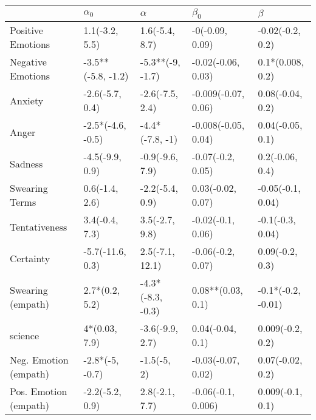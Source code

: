 \begin{tabular}{lllll}
\toprule
{} &          $\alpha_0$ &           $\alpha$ &            $\beta_0$ &             $\beta$ \\
\midrule
Positive Emotions     &      1.1(-3.2, 5.5) &     1.6(-5.4, 8.7) &      -0(-0.09, 0.09) &    -0.02(-0.2, 0.2) \\
Negative Emotions     &  -3.5**(-5.8, -1.2) &   -5.3**(-9, -1.7) &   -0.02(-0.06, 0.03) &    0.1*(0.008, 0.2) \\
Anxiety               &     -2.6(-5.7, 0.4) &    -2.6(-7.5, 2.4) &  -0.009(-0.07, 0.06) &    0.08(-0.04, 0.2) \\
Anger                 &   -2.5*(-4.6, -0.5) &    -4.4*(-7.8, -1) &  -0.008(-0.05, 0.04) &    0.04(-0.05, 0.1) \\
Sadness               &     -4.5(-9.9, 0.9) &    -0.9(-9.6, 7.9) &    -0.07(-0.2, 0.05) &     0.2(-0.06, 0.4) \\
Swearing Terms        &      0.6(-1.4, 2.6) &    -2.2(-5.4, 0.9) &    0.03(-0.02, 0.07) &   -0.05(-0.1, 0.04) \\
Tentativeness         &      3.4(-0.4, 7.3) &     3.5(-2.7, 9.8) &    -0.02(-0.1, 0.06) &    -0.1(-0.3, 0.04) \\
Certainty             &    -5.7(-11.6, 0.3) &    2.5(-7.1, 12.1) &    -0.06(-0.2, 0.07) &     0.09(-0.2, 0.3) \\
Swearing (empath)     &      2.7*(0.2, 5.2) &  -4.3*(-8.3, -0.3) &    0.08**(0.03, 0.1) &  -0.1*(-0.2, -0.01) \\
science               &       4*(0.03, 7.9) &    -3.6(-9.9, 2.7) &     0.04(-0.04, 0.1) &    0.009(-0.2, 0.2) \\
Neg. Emotion (empath) &     -2.8*(-5, -0.7) &        -1.5(-5, 2) &   -0.03(-0.07, 0.02) &    0.07(-0.02, 0.2) \\
Pos. Emotion (empath) &     -2.2(-5.2, 0.9) &     2.8(-2.1, 7.7) &   -0.06(-0.1, 0.006) &    0.009(-0.1, 0.1) \\
\bottomrule
\end{tabular}
